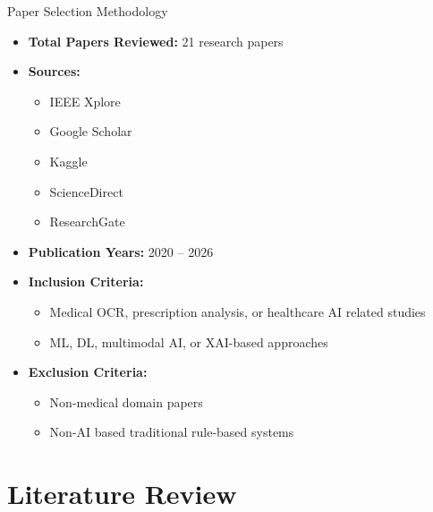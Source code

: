 \documentclass[11pt,aspectratio=169]{beamer}
\begin{document}
\begin{frame}{Paper Selection Methodology}

\begin{itemize}
    \item \textbf{Total Papers Reviewed:} 21 research papers
    
    \item \textbf{Sources:}
    \begin{itemize}
        \item IEEE Xplore
        \item Google Scholar
        \item Kaggle
        \item ScienceDirect
        \item ResearchGate
    \end{itemize}
    
    \item \textbf{Publication Years:} 2020 -- 2026
    
    \item \textbf{Inclusion Criteria:}
    \begin{itemize}
        \item Medical OCR, prescription analysis, or healthcare AI related studies
        \item ML, DL, multimodal AI, or XAI-based approaches
    \end{itemize}
    \item \textbf{Exclusion Criteria:}
    \begin{itemize}
        \item Non-medical domain papers
        \item Non-AI based traditional rule-based systems
    \end{itemize}
\end{itemize}
\end{frame}





\section{Literature Review}
\end{document}
